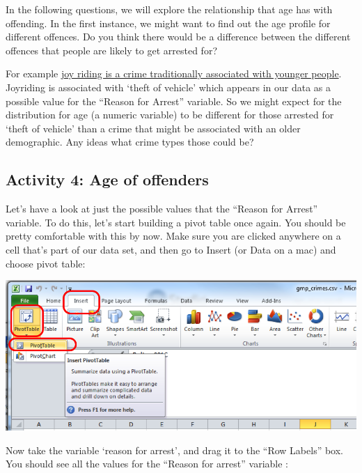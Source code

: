\documentclass[]{book}
\theoremstyle{definition}
\theoremstyle{definition}
\theoremstyle{definition}
\theoremstyle{remark}
\begin{document}
In the following questions, we will explore the relationship that age
has with offending. In the first instance, we might want to find out the
age profile for different offences. Do you think there would be a
difference between the different offences that people are likely to get
arrested for?

For example
\href{http://www.tandfonline.com/doi/abs/10.1080/10683160512331316343}{joy
riding is a crime traditionally associated with younger people}.
Joyriding is associated with `theft of vehicle' which appears in our
data as a possible value for the ``Reason for Arrest'' variable. So we
might expect for the distribution for age (a numeric variable) to be
different for those arrested for `theft of vehicle' than a crime that
might be associated with an older demographic. Any ideas what crime
types those could be?

\hypertarget{activity-4-age-of-offenders}{%
\subsection{Activity 4: Age of
offenders}\label{activity-4-age-of-offenders}}

 Let's have a look at just the possible values that the ``Reason for
Arrest'' variable. To do this, let's start building a pivot table once
again. You should be pretty comfortable with this by now. Make sure you
are clicked anywhere on a cell that's part of our data set, and then go
to Insert (or Data on a mac) and choose pivot table:

\includegraphics{imgs/click_pivot.png}

Now take the variable `reason for arrest', and drag it to the ``Row
Labels'' box. You should see all the values for the ``Reason for
arrest'' variable :
\end{document}

